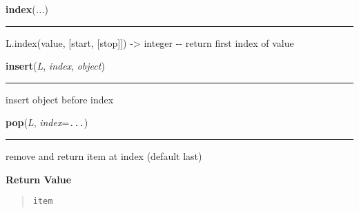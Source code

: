     \label{list:index}

    \vspace{0.5ex}

    \begin{boxedminipage}{\textwidth}

    \raggedright \textbf{index}(\textit{...})

    \vspace{-1.5ex}

    \rule{\textwidth}{0.5\fboxrule}

L.index(value, {[}start, {[}stop{]}{]}) -{\textgreater} integer -{}- return first index of value
    \vspace{1ex}

    \end{boxedminipage}

    \label{list:insert}

    \vspace{0.5ex}

    \begin{boxedminipage}{\textwidth}

    \raggedright \textbf{insert}(\textit{L}, \textit{index}, \textit{object})

    \vspace{-1.5ex}

    \rule{\textwidth}{0.5\fboxrule}

insert object before index
    \vspace{1ex}

    \end{boxedminipage}

    \label{list:pop}

    \vspace{0.5ex}

    \begin{boxedminipage}{\textwidth}

    \raggedright \textbf{pop}(\textit{L}, \textit{index}=\texttt{...})

    \vspace{-1.5ex}

    \rule{\textwidth}{0.5\fboxrule}

remove and return item at index (default last)
    \vspace{1ex}

      \textbf{Return Value}
      \begin{quote}
\begin{alltt}
item
\end{alltt}

      \end{quote}

    \vspace{1ex}

    \end{boxedminipage}

